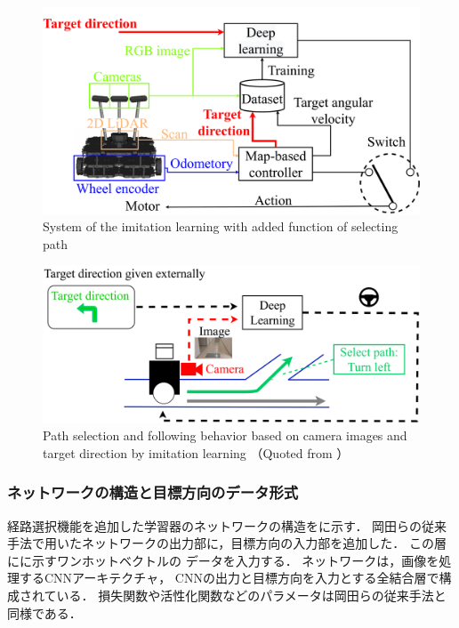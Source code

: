 \begin{figure}[htbp]
    \centering
     \includegraphics[width=130mm]{images/pdf/haru_mech_sys.pdf}
     \caption{System of the imitation learning with added function of
     selecting path}
     \label{fig:haru_mech_sys}
\end{figure}
\begin{figure}[htbp]
    \centering
     \includegraphics[width=130mm]{images/pdf/learning_gamma.pdf}
     \caption{Path selection and following behavior based on camera images 
     and target direction by imitation learning （Quoted from \cite{haruyama2023}）}
     \label{fig:path_select_abs}
\end{figure}

\clearpage
\subsubsection{ネットワークの構造と目標方向のデータ形式}
経路選択機能を追加した学習器のネットワークの構造をに示す．
岡田らの従来手法で用いたネットワークの出力部に，目標方向の入力部を追加した．
この層にに示すワンホットベクトルの
データを入力する．
ネットワークは，画像を処理するCNNアーキテクチャ，
CNNの出力と目標方向を入力とする全結合層で構成されている．
損失関数や活性化関数などのパラメータは岡田らの従来手法と同様である．

